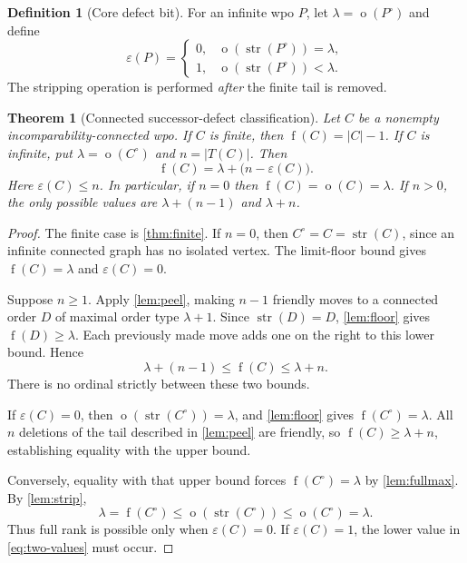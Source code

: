 \documentclass[11pt,a4paper]{article}
\newtheorem{theorem}{Theorem}[section]
\theoremstyle{definition}
\newtheorem{definition}[definition]{Definition}
\theoremstyle{remark}
\DeclareMathOperator{\mot}{o}
\DeclareMathOperator{\fot}{f}
\DeclareMathOperator{\str}{str}
\newcommand{\core}[1]{{#1}^{\circ}}
\newcommand{\eps}{\varepsilon}
\begin{document}
\begin{definition}[Core defect bit]\label{def:epsilon}
For an infinite wpo $P$, let $\lambda=\mot(\core{P})$ and define
\[
\eps(P)=
\begin{cases}
0,&\mot(\str(\core{P}))=\lambda,\\
1,&\mot(\str(\core{P}))<\lambda.
\end{cases}
\]
The stripping operation is performed \emph{after} the finite tail is removed.
\end{definition}

\begin{theorem}[Connected successor-defect classification]\label{thm:connected}
Let $C$ be a nonempty incomparability-connected wpo.
If $C$ is finite, then $\fot(C)=|C|-1$.
If $C$ is infinite, put $\lambda=\mot(\core{C})$ and $n=|T(C)|$. Then
\begin{equation}\label{eq:connected}
\boxed{\fot(C)=\lambda+\bigl(n-\eps(C)\bigr).}
\end{equation}
Here $\eps(C)\leq n$. In particular, if $n=0$ then
$\fot(C)=\mot(C)=\lambda$. If $n>0$, the only possible values are
$\lambda+(n-1)$ and $\lambda+n$.
\end{theorem}
\begin{proof}
The finite case is \cref{thm:finite}. If $n=0$, then
$\core{C}=C=\str(C)$, since an infinite connected graph has no isolated
vertex. The limit-floor bound gives $\fot(C)=\lambda$ and $\eps(C)=0$.

Suppose $n\geq1$. Apply \cref{lem:peel}, making $n-1$ friendly moves to a
connected order $D$ of maximal order type $\lambda+1$. Since
$\str(D)=D$, \cref{lem:floor} gives $\fot(D)\geq\lambda$. Each previously
made move adds one on the right to this lower bound. Hence
\begin{equation}\label{eq:two-values}
\lambda+(n-1)\leq\fot(C)\leq\lambda+n.
\end{equation}
There is no ordinal strictly between these two bounds.

If $\eps(C)=0$, then $\mot(\str(\core{C}))=\lambda$, and
\cref{lem:floor} gives $\fot(\core{C})=\lambda$. All $n$ deletions of the
tail described in \cref{lem:peel} are friendly, so
$\fot(C)\geq\lambda+n$, establishing equality with the upper bound.

Conversely, equality with that upper bound forces
$\fot(\core{C})=\lambda$ by \cref{lem:fullmax}. By \cref{lem:strip},
\[
\lambda=\fot(\core{C})
\leq\mot(\str(\core{C}))\leq\mot(\core{C})=\lambda.
\]
Thus full rank is possible only when $\eps(C)=0$. If $\eps(C)=1$, the
lower value in \eqref{eq:two-values} must occur.
\end{proof}
\end{document}
